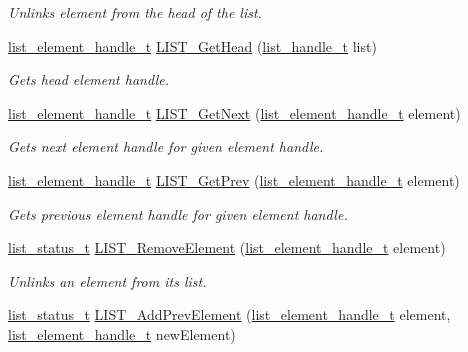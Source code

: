 \begin{DoxyCompactItemize}
\begin{DoxyCompactList}\small\item\em Unlinks element from the head of the list. \end{DoxyCompactList}\item 
\mbox{\hyperlink{structlist__element__tag}{list\+\_\+element\+\_\+handle\+\_\+t}} \mbox{\hyperlink{group___generic_list_ga33117981034d1af2c97fe60d1ca26629}{L\+I\+S\+T\+\_\+\+Get\+Head}} (\mbox{\hyperlink{structlist__label}{list\+\_\+handle\+\_\+t}} list)
\begin{DoxyCompactList}\small\item\em Gets head element handle. \end{DoxyCompactList}\item 
\mbox{\hyperlink{structlist__element__tag}{list\+\_\+element\+\_\+handle\+\_\+t}} \mbox{\hyperlink{group___generic_list_ga81ccc9e202a9475e56ce9735fb33c0fe}{L\+I\+S\+T\+\_\+\+Get\+Next}} (\mbox{\hyperlink{structlist__element__tag}{list\+\_\+element\+\_\+handle\+\_\+t}} element)
\begin{DoxyCompactList}\small\item\em Gets next element handle for given element handle. \end{DoxyCompactList}\item 
\mbox{\hyperlink{structlist__element__tag}{list\+\_\+element\+\_\+handle\+\_\+t}} \mbox{\hyperlink{group___generic_list_ga745fa7114f0facf6edb011e2c7139aa4}{L\+I\+S\+T\+\_\+\+Get\+Prev}} (\mbox{\hyperlink{structlist__element__tag}{list\+\_\+element\+\_\+handle\+\_\+t}} element)
\begin{DoxyCompactList}\small\item\em Gets previous element handle for given element handle. \end{DoxyCompactList}\item 
\mbox{\hyperlink{group___generic_list_gaae3dc4a15b24287b8c3ac8706195aa7e}{list\+\_\+status\+\_\+t}} \mbox{\hyperlink{group___generic_list_gac92c4d99a64c3cef1c7c6c74b97fb93b}{L\+I\+S\+T\+\_\+\+Remove\+Element}} (\mbox{\hyperlink{structlist__element__tag}{list\+\_\+element\+\_\+handle\+\_\+t}} element)
\begin{DoxyCompactList}\small\item\em Unlinks an element from its list. \end{DoxyCompactList}\item 
\mbox{\hyperlink{group___generic_list_gaae3dc4a15b24287b8c3ac8706195aa7e}{list\+\_\+status\+\_\+t}} \mbox{\hyperlink{group___generic_list_ga715b202be720d60e063a6b0dbac502a9}{L\+I\+S\+T\+\_\+\+Add\+Prev\+Element}} (\mbox{\hyperlink{structlist__element__tag}{list\+\_\+element\+\_\+handle\+\_\+t}} element, \mbox{\hyperlink{structlist__element__tag}{list\+\_\+element\+\_\+handle\+\_\+t}} new\+Element)

\end{DoxyCompactItemize}
